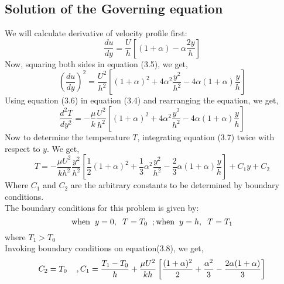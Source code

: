 \documentclass[14pt,one side, a4paper]{extbook}
\begin{document}
	 	\subsection{Solution of the Governing equation}
	 	We will calculate derivative of velocity profile first:
	 	\begin{equation}
	 		\frac{du}{dy}=\frac{U}{h}\left[(1+\alpha)-\alpha\frac{2y}{h}\right]
	 	\end{equation}
	 	Now, squaring both sides in equation (3.5), we get,
	 	\begin{equation}
	 		\left(\frac{du}{dy}\right)^{2}=\frac{U^2}{h^{2}}\left[(1+\alpha)^{2}+4\alpha^{2}\frac{y^{2}}{h^{2}}-4\alpha(1+\alpha)\frac{y}{h}\right]
	 	\end{equation}
	 	Using equation (3.6) in equation (3.4) and rearranging the equation, we get,
	 	\begin{equation}
	 		\frac{d^{2}T}{dy^{2}}=-\frac{\mu}{k}\frac{U^{2}}{h^{2}}\left[(1+\alpha)^{2}+4\alpha^{2}\frac{y^{2}}{h^{2}}-4\alpha(1+\alpha)\frac{y}{h}\right]
	 	\end{equation}
	 	Now to determine the temperature $T$, integrating equation (3.7) twice with respect to $y$. We get,
	 	\begin{equation}
	 		T=-\frac{\mu U^{2}}{kh^{2}}\frac{y^{2}}{h^{2}}\left[\frac{1}{2}(1+\alpha)^{2}+\frac{1}{3}\alpha^{2}\frac{y^{2}}{h^{2}}-\frac{2}{3}\alpha(1+\alpha)\frac{y}{h}\right]+C_{1}y+C_{2}
	 	\end{equation}
	 	Where $C_{1}$ and $C_{2}$ are the arbitrary constants to be determined by boundary conditions.
	 	\\The boundary conditions for this problem is given by:
	 	\begin{equation}
	 		\textrm{when}\hspace*{0.2cm} y=0,\hspace*{0.2cm}T=T_{0}\hspace{0.2cm};\textrm{when}\hspace*{0.2cm} y=h,\hspace*{0.2cm} T=T_{1}
	 	\end{equation}
	 	where $T_{1}>T_{0}$\\Invoking boundary conditions on equation(3.8), we get,
	 	\begin{equation}
	 		C_{2}=T_{0}\hspace{0.4cm},C_{1}=\frac{T_{1}-T_{0}}{h}+\frac{\mu U^{2}}{kh}\left[\frac{(1+\alpha)^{2}}{2}+\frac{\alpha^{2}}{3}-\frac{2\alpha(1+\alpha)}{3}\right]
	 	\end{equation}
\end{document}
